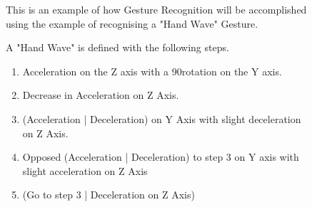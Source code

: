 \documentclass[12pt,a4paper,oneside]{book}
\theoremstyle{plain}
\numberwithin{equation}{chapter}
\begin{document}
\begin{figure}
    \noindent This is an example of how Gesture Recognition will be accomplished using the example of recognising a "Hand Wave" Gesture.

    \vspace{1cm}

    A "Hand Wave" is defined with the following steps.
    \begin{enumerate}
        \item Acceleration on the Z axis with a 90\degree rotation on the Y axis.
        \item Decrease in Acceleration on Z Axis.
        \item (Acceleration | Deceleration) on Y Axis with slight deceleration on Z Axis.
        \item Opposed (Acceleration | Deceleration) to step 3 on Y axis with slight acceleration on Z Axis
        \item (Go to step 3 | Deceleration on Z Axis)
    \end{enumerate}

    \vspace{1cm}

    \centering
\end{figure}
\end{document}
